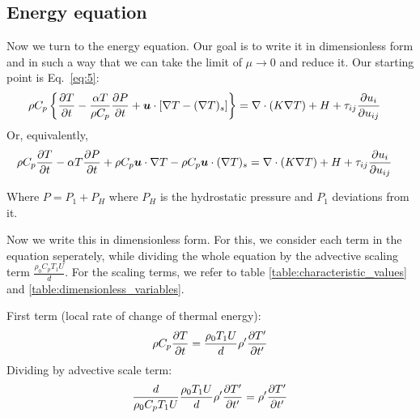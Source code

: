 \documentclass[document.tex]{subfiles}
\begin{document}
\subsection{Energy equation}
Now we turn to the energy equation. Our goal is to write it in dimensionless form and in such a way that we can take the limit of $\mu \to 0$ and reduce it. 
Our starting point is Eq.~\eqref{eq:5}: 
\begin{align*}
    \rho C_p \left\{\pdv{T}{t} - \frac{\alpha T}{\rho C_p}\pdv{P}{t} + \bm{u} \cdot [\nabla T - (\nabla T)_s]\right\} &= 
    \nabla \cdot (K\nabla T) + H + \tau_{ij}\pdv{u_i}{u_{ij}}
\end{align*}
Or, equivalently,
\begin{align*}
    \rho C_p\pdv{T}{t} - \alpha T\pdv{P}{t} + \rho C_p \bm{u} \cdot \nabla T - \rho C_p \bm{u} \cdot (\nabla T)_s &= 
    \nabla \cdot (K\nabla T) + H + \tau_{ij}\pdv{u_i}{u_{ij}}
\end{align*}

Where $P = P_1 + P_H$ where $P_H$ is the hydrostatic pressure and $P_1$ deviations from it. 

Now we write this in dimensionless form. For this, we consider each term in the equation seperately, while dividing the whole equation by the advective scaling term 
$\frac{\rho_0 C_p T_1 U}{d}$. For the scaling terms, we refer to table \ref{table:characteristic_values} and \ref{table:dimensionless_variables}.

\begin{mdframed}
First term (local rate of change of thermal energy): 
    \begin{align*}
        \rho C_p\pdv{T}{t} &= \frac{\rho_0T_1U}{d} \rho' \pdv{T'}{t'} \\
    \end{align*}
Dividing by advective scale term: 
    \begin{align*}
        \frac{d}{\rho_0C_p T_1 U}\frac{\rho_0T_1U}{d} \rho' \pdv{T'}{t'} =\rho' \pdv{T'}{t'} \\
    \end{align*}
\end{mdframed}
\end{document}
